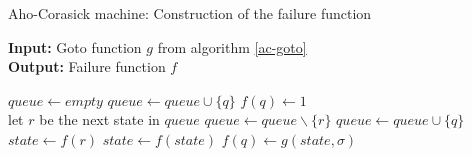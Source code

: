 \documentclass[english,twoside,censored,csm,algorithms-track-2020]{HYthesisML}
\theoremstyle{plain}
\theoremstyle{definition}
\numberwithin{testexample}{chapter}
\begin{document}
  \begin{algorithm}[]

    \caption{Aho-Corasick machine: Construction of the failure function} \label{ac-fail}
    \hspace*{\algorithmicindent} \textbf{Input:} Goto function $g$ from algorithm \ref{ac-goto}\\
    \hspace*{\algorithmicindent} \textbf{Output:} Failure function $f$

    \begin{algorithmic}[1]
        \State $queue\gets \textit{empty}$
          \State $queue\gets queue \cup \{q\}$
          \State $f(q)\gets 1$
        \EndFor
        \\
          \hspace*{1.2cm plus \algorithmicindent}let $r$ be the next state in $queue$
          \State $queue\gets queue \backslash \{r\}$
            \State $queue\gets queue \cup \{q\}$
            \State $state\gets f(r)$
              \State $state\gets f(state)$
            \EndWhile
            \State $f(q)\gets g(state,\sigma)$              
          \EndFor
        \EndWhile
          
      \EndFunction

    \end{algorithmic}
  \end{algorithm}
\end{document}
